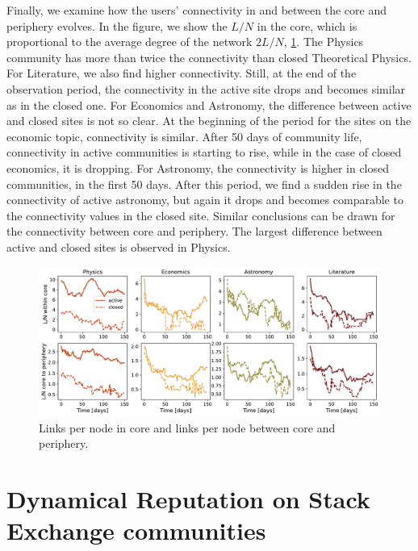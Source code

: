 Finally, we examine how the users' connectivity in and between the core and periphery evolves. In the figure, we show the $L/N$ in the core, which is proportional to the average degree of the network $2L/N$, \ref{fig:links_per_node}. The Physics community has more than twice the connectivity than closed Theoretical Physics. For Literature, we also find higher connectivity. Still, at the end of the observation period, the connectivity in the active site drops and becomes similar as in the closed one. For Economics and Astronomy, the difference between active and closed sites is not so clear. At the beginning of the period for the sites on the economic topic, connectivity is similar. After 50 days of community life, connectivity in active communities is starting to rise, while in the case of closed economics, it is dropping. For Astronomy, the connectivity is higher in closed communities, in the first 50 days. After this period, we find a sudden rise in the connectivity of active astronomy, but again it drops and becomes comparable to the connectivity values in the closed site. Similar conclusions can be drawn for the connectivity between core and periphery. The largest difference between active and closed sites is observed in Physics.  

\begin{figure}[h]
	\centering
	\includegraphics[width=\linewidth]{figures/stackexchange/core_connectivity.pdf}
	\caption{Links per node in core and links per node between core and periphery.}
	\label{fig:links_per_node}
\end{figure}

\section{Dynamical Reputation on Stack Exchange communities}

